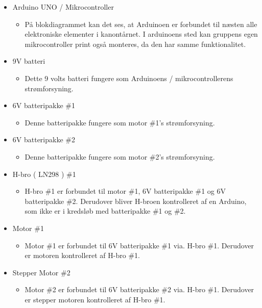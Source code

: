 \begin{itemize}
	\item Arduino UNO / Mikrocontroller
\begin{itemize}
\item På blokdiagrammet kan det ses, at Arduinoen er forbundet til næsten alle elektroniske elementer i kanontårnet. I arduinoens sted kan gruppens egen mikrocontroller print også monteres, da den har samme funktionalitet.
\end{itemize}

	\item 9V batteri
\begin{itemize}
\item Dette 9 volts batteri fungere som Arduinoens / mikrocontrollerens strømforsyning.
\end{itemize}

	\item 6V batteripakke \#1
\begin{itemize}
\item Denne batteripakke fungere som motor \#1’s strømforsyning.
\end{itemize}

	\item 6V batteripakke \#2
\begin{itemize}
\item Denne batteripakke fungere som motor \#2’s strømforsyning.
\end{itemize}

	\item H-bro ( LN298 ) \#1
\begin{itemize}
\item H-bro \#1 er forbundet til motor \#1, 6V batteripakke \#1 og 6V batteripakke \#2. Derudover bliver H-broen kontrolleret af en Arduino, som ikke er i kredsløb med batteripakke \#1 og \#2.
\end{itemize}

	\item Motor \#1
\begin{itemize}
\item Motor \#1 er forbundet til 6V batteripakke \#1 via. H-bro \#1. Derudover er motoren kontrolleret af H-bro \#1. 
\end{itemize}

	\item Stepper Motor \#2
\begin{itemize}
\item Motor \#2 er forbundet til 6V  batteripakke \#2 via. H-bro \#1. Derudover er stepper motoren kontrolleret af H-bro \#1.
\end{itemize}


\end{itemize}

